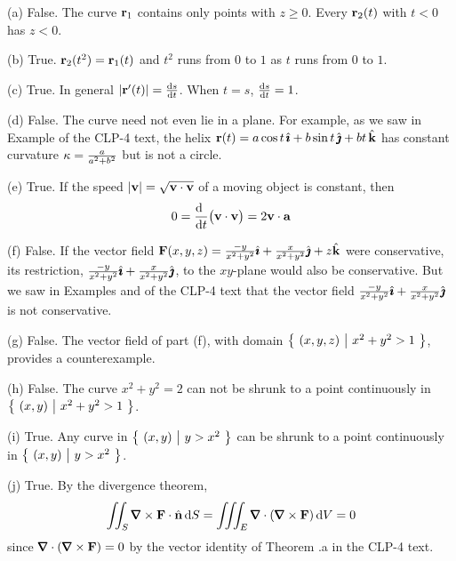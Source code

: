 \begin{solution} 
(a) 
False. The curve $\mathbf{r}_1$ contains only points with $z\ge0$. 
Every $\mathbf{r}_2(t)$ with $t< 0$  has $z<0$.

(b) True. $\mathbf{r}_2(t^2)=\mathbf{r}_1(t)$ and $t^2$ runs from $0$ to $1$ as
$t$ runs from $0$ to $1$.

(c) True. In general $|\vr'(t)| = \diff{s}{t}$. When $t=s$, $\diff{s}{t}=1$.

(d) False. The curve need not even lie in a plane. For example, as we
saw in Example   of the CLP-4 text, the helix
$\mathbf{r}(t) = a\cos t\,\hat{\pmb{\imath}} +b\sin t\,\hat{\pmb{\jmath}} + bt\,\hat{\mathbf{k}}$ has constant curvature
$\kappa=\frac{a}{a^2+b^2}$ but is not a circle.

(e) True. If the speed $|\mathbf{v}|=\sqrt{\mathbf{v}\cdot\mathbf{v}}$ of a moving object is constant, then
\begin{equation*}
0=\diff{\hfill}{t}\big(\vv\cdot\vv\big)=2\vv\cdot\va
\end{equation*}

(f) False. If the vector field
$
\mathbf{F}(x, y, z) = \frac{-y}{x^2+y^2} \hat{\pmb{\imath}} 
               + \frac{x}{x^2+y^2} \hat{\pmb{\jmath}}
               + z\hat{\mathbf{k}}
$
were conservative, its restriction, $\frac{-y}{x^2+y^2} \hat{\pmb{\imath}}+ \frac{x}{x^2+y^2} \hat{\pmb{\jmath}}$,
to the $xy$-plane would also be conservative. But we saw in
Examples   and
 of the CLP-4 text that the vector 
field $\frac{-y}{x^2+y^2} \hat{\pmb{\imath}}+ \frac{x}{x^2+y^2} \hat{\pmb{\jmath}}$ is not conservative.  

(g) False. The vector field of part (f), with domain
$\big\{ \ (x,y,z)\ \big|\  x^2+y^2>1\ \big\}$, provides a counterexample.  

(h) False. The curve $x^2+y^2 = 2$ can not be shrunk to a 
point continuously in $\big\{ \  (x, y) \ \big|\  x^2 + y^2 > 1 \ \big\}$.

(i) True. Any curve in $\big\{ \  (x, y) \ \big|\  y > x^2  \ \big\}$ can be shrunk to a 
point continuously in $\big\{ \  (x, y) \ \big|\  y > x^2  \ \big\}$.

(j) True. By the divergence theorem,
\begin{align*}
\dblInt_S \vnabla\times \vF \cdot\hn\, \dee{S}
=\tripInt_E \vnabla\cdot(\vnabla\times \vF)\, \dee{V}
=0
\end{align*}
since $\vnabla\cdot(\vnabla\times \vF)=0$ by the vector identity
of Theorem .a in the CLP-4 text.

\end{solution}


